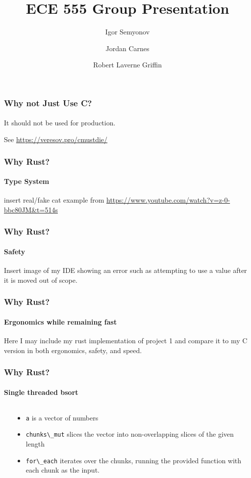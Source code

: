 \documentclass[aspectratio=169]{beamer}
\title[Short Title]{
    ECE 555 Group Presentation
}
\author{
	Igor Semyonov
	\and Jordan Carnes
	\and Robert Laverne Griffin
}
\institute{
    George Macon University, Department of Electrical and Computer Engineering
}
\begin{document}
\begin{frame}
	\vspace{-1.8cm}
	\titlepage
\end{frame}

\begin{frame}
	\frametitle{Why not Just Use C?}
	\framesubtitle{}

	It should not be used for production.

	See \url{https://veresov.pro/cmustdie/}
\end{frame}

\begin{frame}
	\frametitle{Why Rust?}
	\framesubtitle{Type System}

	insert real/fake cat example from \url{https://www.youtube.com/watch?v=z-0-bbc80JM&t=514s}
\end{frame}

\begin{frame}
	\frametitle{Why Rust?}
	\framesubtitle{Safety}

	Insert image of my IDE showing an error such as attempting to use a value after it is moved out of scope.
\end{frame}

\begin{frame}
	\frametitle{Why Rust?}
	\framesubtitle{Ergonomics while remaining fast}

	Here I may include my rust implementation of project 1 and compare it to my C version in both ergonomics, safety, and speed.
\end{frame}

\begin{frame}
	\frametitle{Why Rust?}
	\framesubtitle{Single threaded bsort}
	\begin{columns}
		\begin{column}{ 0.5\textwidth }
			
		\end{column}
		\begin{column}{ 0.4\textwidth }
			\begin{itemize}
				\item \Verb|a| is a vector of numbers
				\item \Verb|chunks\_mut| slices the vector into non-overlapping slices of the given length
				\item \Verb|for\_each| iterates over the chunks, running the provided function with each chunk as the input.
			\end{itemize}
		\end{column}
	\end{columns}
\end{frame}
\end{document}
